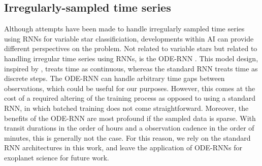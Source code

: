 \subsection{Irregularly-sampled time series}
Although attempts have been made to handle irregularly sampled time series using RNNs for variable star classificiation, developments within AI can provide different perspectives on the problem. Not related to variable stars but related to handling irregular time series using RNNs, is the ODE-RNN \cite{rubanova2019latent}. This model design, inspired by \cite{chen2018neural}, treats time as continuous, whereas the standard RNN treats time as discrete steps. The ODE-RNN can handle arbitrary time gaps between observations, which could be useful for our purposes. However, this comes at the cost of a required altering of the training process as opposed to using a standard RNN, in which batched training does not come straightforward. Moreover, the benefits of the ODE-RNN are most profound if the sampled data is sparse. With transit durations in the order of hours and a observation cadence in the order of minutes, this is generally not the case. For this reason, we rely on the standard RNN architectures in this work, and leave the application of ODE-RNNs for exoplanet science for future work.